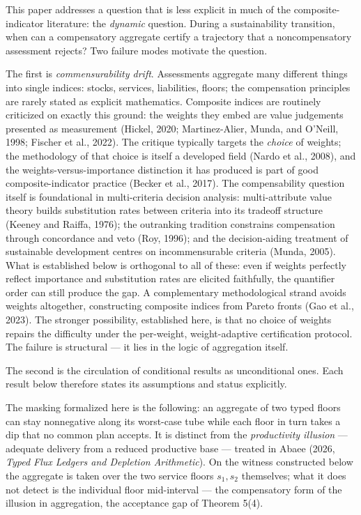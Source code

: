\documentclass[3p,11pt]{elsarticle}
\begin{document}
This paper addresses a question that is less explicit in much of the
composite-indicator literature: the \emph{dynamic} question. During a sustainability
transition, when can a compensatory aggregate certify a trajectory that
a noncompensatory assessment rejects? Two failure modes motivate the
question.

The first is \emph{commensurability drift}. Assessments aggregate
many different things into single indices: stocks, services,
liabilities, floors; the compensation principles are rarely stated as
explicit mathematics.
Composite indices are routinely criticized on exactly this ground: the
weights they embed are value judgements presented as measurement
(Hickel, 2020; Martinez-Alier, Munda, and O'Neill, 1998; Fischer et al.,
2022). The critique
typically targets the \emph{choice} of weights; the methodology of that
choice is itself a developed field (Nardo et al., 2008), and the
weights-versus-importance distinction it has produced is part of good
composite-indicator practice (Becker et al., 2017). The compensability
question itself is foundational in multi-criteria decision analysis:
multi-attribute value theory builds substitution rates between criteria
into its tradeoff structure (Keeney and Raiffa, 1976); the outranking
tradition constrains compensation through concordance and veto (Roy,
1996); and the decision-aiding treatment of sustainable development
centres on incommensurable criteria (Munda, 2005). What is established
below is orthogonal to all of these: even if weights perfectly reflect
importance and substitution rates are elicited faithfully, the
quantifier order can still produce the gap. A complementary methodological strand avoids weights altogether, constructing composite indices from Pareto fronts (Gao et al., 2023). The stronger possibility, established here, is that no choice of weights repairs the difficulty under the per-weight, weight-adaptive certification protocol. The failure is structural --- it lies in
the logic of aggregation itself.

The second is the circulation of conditional results as unconditional ones. Each result below therefore states its assumptions and status explicitly.

The masking formalized here is the following: an aggregate of two typed
floors can stay nonnegative along its worst-case tube while each floor
in turn takes a dip that no common plan accepts. It is distinct from the \emph{productivity illusion} --- adequate delivery from a reduced productive base --- treated in Abaee (2026, \emph{Typed Flux Ledgers and Depletion Arithmetic}). On the
witness constructed below the aggregate is taken over the two service
floors \(s_1, s_2\) themselves; what it does not detect is the individual floor mid-interval --- the compensatory form of the illusion in aggregation, the acceptance gap of Theorem 5(4).
\end{document}
